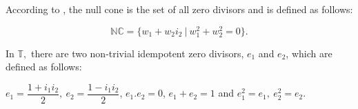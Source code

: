\documentclass[a4paper,12pt]{article}
\theoremstyle{remark}
\begin{document}
\noindent %
According to \cite{rochon2004a}, the null cone is the set of all zero divisors and is defined as follows:
	
\begin{equation}\label{eq:s nullcone}
\mathbb{NC} = \{w_1 +w_2i_2 ~|~w_1^2 +w_2 ^2 = 0 \}. 
\end{equation}
	
\noindent In $\mathbb{T},$ there are two non-trivial idempotent zero divisors, $e_1$ and $e_2$, which are defined as follows:

$	e_1 =  \dfrac{1 + i_1i_2}{2},~ e_2   =\dfrac  {1 - i_1i_2}{2} $, $e_1.e_2   = 0$,  $ e_1+ e_2 = 1$	   and $e_1^2=e_1,~e_2^2=e_2$.
	
\end{document}
